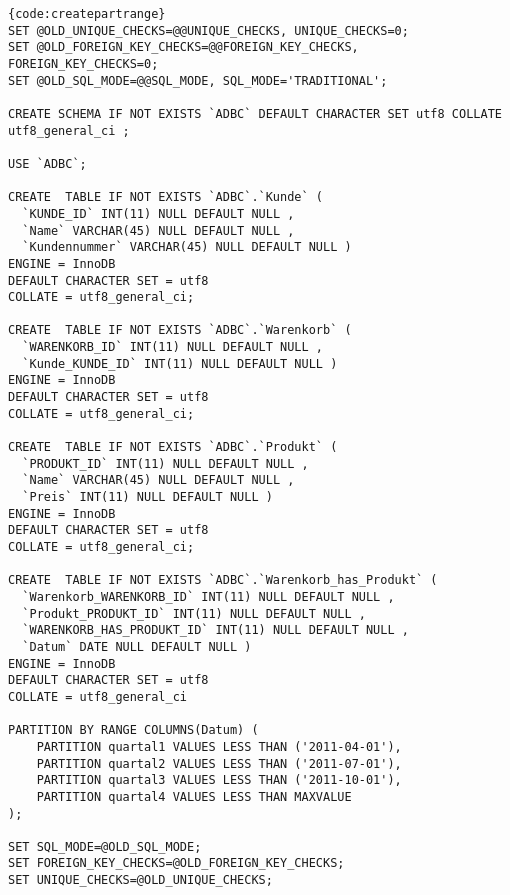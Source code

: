 \begin{lstlisting}[caption=Tabellenerzeugung mit Range-Partitioning, firstnumber=1]{code:createpartrange}
SET @OLD_UNIQUE_CHECKS=@@UNIQUE_CHECKS, UNIQUE_CHECKS=0;
SET @OLD_FOREIGN_KEY_CHECKS=@@FOREIGN_KEY_CHECKS, FOREIGN_KEY_CHECKS=0;
SET @OLD_SQL_MODE=@@SQL_MODE, SQL_MODE='TRADITIONAL';

CREATE SCHEMA IF NOT EXISTS `ADBC` DEFAULT CHARACTER SET utf8 COLLATE utf8_general_ci ;

USE `ADBC`;

CREATE  TABLE IF NOT EXISTS `ADBC`.`Kunde` (
  `KUNDE_ID` INT(11) NULL DEFAULT NULL ,
  `Name` VARCHAR(45) NULL DEFAULT NULL ,
  `Kundennummer` VARCHAR(45) NULL DEFAULT NULL )
ENGINE = InnoDB
DEFAULT CHARACTER SET = utf8
COLLATE = utf8_general_ci;

CREATE  TABLE IF NOT EXISTS `ADBC`.`Warenkorb` (
  `WARENKORB_ID` INT(11) NULL DEFAULT NULL ,
  `Kunde_KUNDE_ID` INT(11) NULL DEFAULT NULL )
ENGINE = InnoDB
DEFAULT CHARACTER SET = utf8
COLLATE = utf8_general_ci;

CREATE  TABLE IF NOT EXISTS `ADBC`.`Produkt` (
  `PRODUKT_ID` INT(11) NULL DEFAULT NULL ,
  `Name` VARCHAR(45) NULL DEFAULT NULL ,
  `Preis` INT(11) NULL DEFAULT NULL )
ENGINE = InnoDB
DEFAULT CHARACTER SET = utf8
COLLATE = utf8_general_ci;

CREATE  TABLE IF NOT EXISTS `ADBC`.`Warenkorb_has_Produkt` (
  `Warenkorb_WARENKORB_ID` INT(11) NULL DEFAULT NULL ,
  `Produkt_PRODUKT_ID` INT(11) NULL DEFAULT NULL ,
  `WARENKORB_HAS_PRODUKT_ID` INT(11) NULL DEFAULT NULL ,
  `Datum` DATE NULL DEFAULT NULL )
ENGINE = InnoDB
DEFAULT CHARACTER SET = utf8
COLLATE = utf8_general_ci

PARTITION BY RANGE COLUMNS(Datum) (
    PARTITION quartal1 VALUES LESS THAN ('2011-04-01'),
    PARTITION quartal2 VALUES LESS THAN ('2011-07-01'),
    PARTITION quartal3 VALUES LESS THAN ('2011-10-01'),
    PARTITION quartal4 VALUES LESS THAN MAXVALUE
);

SET SQL_MODE=@OLD_SQL_MODE;
SET FOREIGN_KEY_CHECKS=@OLD_FOREIGN_KEY_CHECKS;
SET UNIQUE_CHECKS=@OLD_UNIQUE_CHECKS;
\end{lstlisting}

